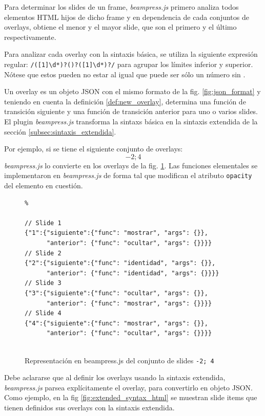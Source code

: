			Para determinar los slides de un frame, \textit{beampress.js} primero analiza todos elementos HTML hijos de dicho frame y en dependencia de cada conjuntos de overlays, obtiene el menor y el mayor slide, que son el primero y el último respectivamente.

			Para analizar cada overlay con la sintaxis básica, se utiliza la siguiente expresión regular: \texttt{/([1]\textbackslash d*)?(\textendash )?([1]\textbackslash d*)?/} para agrupar los límites inferior y superior. Nótese que estos pueden no estar al igual que puede ser sólo un número sin \texttt{\textendash}. 

			Un overlay es un objeto JSON con el mismo formato de la fig. \ref{fig:json_format} y teniendo en cuenta la definición \ref{def:new_overlay}, determina una función de transición siguiente y una función de transición anterior para uno o varios slides. El plugin \textit{beampress.js} transforma la sintaxs básica en la sintaxis extendida de la sección \ref{subsec:sintaxis_extendida}. 

			Por ejemplo, si se tiene el siguiente conjunto de overlays: $$-2; 4$$ \textit{beampress.js} lo convierte en los overlays de la fig. \ref{fig:overlay_set_beampress}. Las funciones elementales se implementaron en \textit{beampress.js} de forma tal que modifican el atributo \texttt{opacity} del elemento en cuestión.

				\begin{figure}[htb]%
					\begin{lstlisting}%

// Slide 1
{"1":{"siguiente":{"func": "mostrar", "args": {}},
      "anterior": {"func": "ocultar", "args": {}}}} 
// Slide 2
{"2":{"siguiente":{"func": "identidad", "args": {}},
      "anterior": {"func": "identidad", "args": {}}}}  
// Slide 3
{"3":{"siguiente":{"func": "ocultar", "args": {}},
      "anterior": {"func": "mostrar", "args": {}}}}  
// Slide 4
{"4":{"siguiente":{"func": "mostrar", "args": {}},
      "anterior": {"func": "ocultar", "args": {}}}}                                       				
	
					\end{lstlisting}
					\caption{Representación en beampress.js del conjunto de slides \texttt{-2; 4}}
					\label{fig:overlay_set_beampress}
				\end{figure}			
					
		
			
			Debe aclararse que al definir los overlays usando la sintaxis extendida, \textit{beampress.js} parsea explícitamente el overlay, para convertirlo en objeto JSON. Como ejemplo, en la fig \ref{fig:extended_syntax_html} se muestran slide items que tienen definidos sus overlays con la sintaxis extendida.

